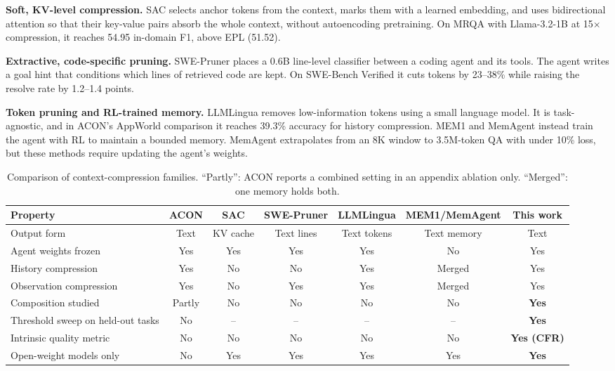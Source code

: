 \documentclass[10pt,a4paper]{article}
\begin{document}
\textbf{Soft, KV-level compression.} SAC \cite{SAC} selects anchor tokens from
the context, marks them with a learned embedding, and uses bidirectional
attention so that their key-value pairs absorb the whole context, without
autoencoding pretraining. On MRQA with Llama-3.2-1B at 15$\times$
compression, it reaches 54.95 in-domain F1, above EPL (51.52).

\textbf{Extractive, code-specific pruning.} SWE-Pruner \cite{SWEPruner} places
a 0.6B line-level classifier between a coding agent and its tools. The agent
writes a goal hint that conditions which lines of retrieved code are kept. On
SWE-Bench Verified it cuts tokens by 23--38\% while raising the resolve rate
by 1.2--1.4 points.

\textbf{Token pruning and RL-trained memory.} LLMLingua \cite{LLMLingua}
removes low-information tokens using a small language model. It is
task-agnostic, and in ACON's AppWorld comparison it reaches 39.3\% accuracy
for history compression. MEM1 \cite{MEM1} and MemAgent \cite{MemAgent} instead
train the agent with RL to maintain a bounded memory. MemAgent extrapolates
from an 8K window to 3.5M-token QA with under 10\% loss, but these methods
require updating the agent's weights.

\begin{table}[h]
\centering
\scriptsize
\renewcommand{\arraystretch}{1.12}
\setlength{\tabcolsep}{3pt}
\begin{tabular}{p{}cccccc}
\toprule
\textbf{Property} & \textbf{ACON} & \textbf{SAC} & \textbf{SWE-Pruner} &
\textbf{LLMLingua} & \textbf{MEM1/MemAgent} & \textbf{This work}\\
\midrule
Output form & Text & KV cache & Text lines & Text tokens & Text memory & Text\\
Agent weights frozen & Yes & Yes & Yes & Yes & No & Yes\\
History compression & Yes & No & No & Yes & Merged & Yes\\
Observation compression & Yes & No & Yes & Yes & Merged & Yes\\
Composition studied & Partly & No & No & No & No & \textbf{Yes}\\
Threshold sweep on held-out tasks & No & -- & -- & -- & -- & \textbf{Yes}\\
Intrinsic quality metric & No & No & No & No & No & \textbf{Yes (CFR)}\\
Open-weight models only & No & Yes & Yes & Yes & Yes & \textbf{Yes}\\
\bottomrule
\end{tabular}
\caption{Comparison of context-compression families. ``Partly'': ACON reports a
combined setting in an appendix ablation only. ``Merged'': one memory holds both.}
\label{tab:lit}
\end{table}
\end{document}
